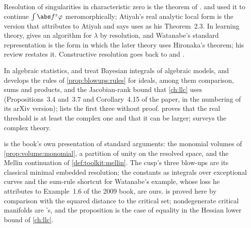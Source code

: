 \begin{refsection}
\notesandrefs
Resolution of singularities in characteristic zero is the theorem of \textcite{Hironaka1964a,Hironaka1964b}. \Textcite{BernsteinGelfand1969} and \textcite{Atiyah1970} used it to continue $\int\abs f^z\varphi$ meromorphically; Atiyah's real analytic local form is the version that \textcite[Theorem~3.3]{Lin2011} attributes to Atiyah and says \textcite{Watanabe2009} uses as his Theorem~2.3. In learning theory, \textcite{Watanabe2001a} gives an algorithm for $\lambda$ by resolution, and Watanabe's standard representation \parencite[Theorem~1]{Watanabe2013} is the form in which the later theory uses Hironaka's theorem; his review \parencite{Watanabe2024} restates it. Constructive resolution goes back to \textcite{Villamayor1989} and \textcite{BierstoneMilman1997}.

In algebraic statistics, \textcite[Chapter~5]{DrtonEtAl2009} and \textcite[Chapter~17]{Sullivant2018} treat Bayesian integrals of algebraic models, and \textcite{Lin2011,Lin2017} develops the rules of \cref{prop:blowups:rules} for ideals, among them comparison, sums and products, and the Jacobian-rank bound that \cref{ch:llc} uses (Propositions~3.4 and~3.7 and Corollary~4.15 of the paper, in the numbering of its arXiv version); \textcite[Section~3]{Watanabe2024} lists the first three without proof. \Textcite{Saito2007} proves that the real threshold is at least the complex one and that it can be larger; \textcite{Kollar1997} surveys the complex theory.

 is the book's own presentation of standard arguments: the monomial volumes of \cref{prop:volume:monomial}, a partition of unity on the resolved space, and the Mellin continuation of \cref{def:toolkit:mellin}. The cusp's three blow-ups are its classical minimal embedded resolution; the constants as integrals over exceptional curves and the sum-rule shortcut for Watanabe's example, whose loss he attributes to Example~1.6 of the 2009 book, are ours.  is proved here by comparison with the squared distance to the critical set; nondegenerate critical manifolds are \textcite{Bott1954}'s, and the proposition is the case of equality in the Hessian lower bound of \cref{ch:llc}.


\end{refsection}
